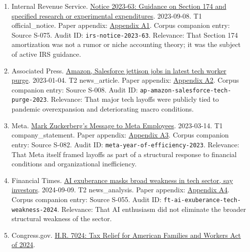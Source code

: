 \documentclass[
  american,
  11pt,
  letterpaper,
]{article}
\providecommand{\tightlist}{%
  \setlength{\itemsep}{0pt}\setlength{\parskip}{0pt}}
\begin{document}
\begin{enumerate}
\def\labelenumi{\arabic{enumi}.}
\tightlist
\item
  Internal Revenue Service.
  \href{https://www.irs.gov/pub/irs-drop/n-23-63.pdf}{Notice 2023-63:
  Guidance on Section 174 and specified research or experimental
  expenditures}. 2023-09-08. T1 official\_notice. Paper appendix:
  \hyperref[ch-05-appendix-a1-notice-2023-63-guidance-on-section-174-and-specified-research-or-experimental-expenditures]{Appendix
  A1}. Corpus companion entry: Source S-075. Audit ID:
  \texttt{irs-notice-2023-63}. Relevance: That Section 174 amortization
  was not a rumor or niche accounting theory; it was the subject of
  active IRS guidance.
\item
  Associated Press.
  \href{https://apnews.com/article/bbb2f3a09eafdfc7cda54a3b87e538ad}{Amazon,
  Salesforce jettison jobs in latest tech worker purge}. 2023-01-04. T2
  news\_article. Paper appendix:
  \hyperref[ch-05-appendix-a2-amazon-salesforce-jettison-jobs-in-latest-tech-worker-purge]{Appendix
  A2}. Corpus companion entry: Source S-008. Audit ID:
  \texttt{ap-amazon-salesforce-tech-purge-2023}. Relevance: That major
  tech layoffs were publicly tied to pandemic overexpansion and
  deteriorating macro conditions.
\item
  Meta.
  \href{https://about.fb.com/news/2023/03/mark-zuckerberg-meta-year-of-efficiency/}{Mark
  Zuckerberg's Message to Meta Employees}. 2023-03-14. T1
  company\_statement. Paper appendix:
  \hyperref[ch-05-appendix-a3-mark-zuckerberg-s-message-to-meta-employees]{Appendix
  A3}. Corpus companion entry: Source S-082. Audit ID:
  \texttt{meta-year-of-efficiency-2023}. Relevance: That Meta itself
  framed layoffs as part of a structural response to financial
  conditions and organizational inefficiency.
\item
  Financial Times.
  \href{https://www.ft.com/content/0b14d871-2d19-46f1-9660-5466301e8066}{AI
  exuberance masks broad weakness in tech sector, say investors}.
  2024-09-09. T2 news\_analysis. Paper appendix:
  \hyperref[ch-05-appendix-a4-ai-exuberance-masks-broad-weakness-in-tech-sector-say-investors]{Appendix
  A4}. Corpus companion entry: Source S-055. Audit ID:
  \texttt{ft-ai-exuberance-tech-weakness-2024}. Relevance: That AI
  enthusiasm did not eliminate the broader structural weakness of the
  sector.
\item
  Congress.gov.
  \href{https://www.congress.gov/bill/118th-congress/house-bill/7024}{H.R.
  7024: Tax Relief for American Families and Workers Act of 2024}.

\end{enumerate}
\end{document}
